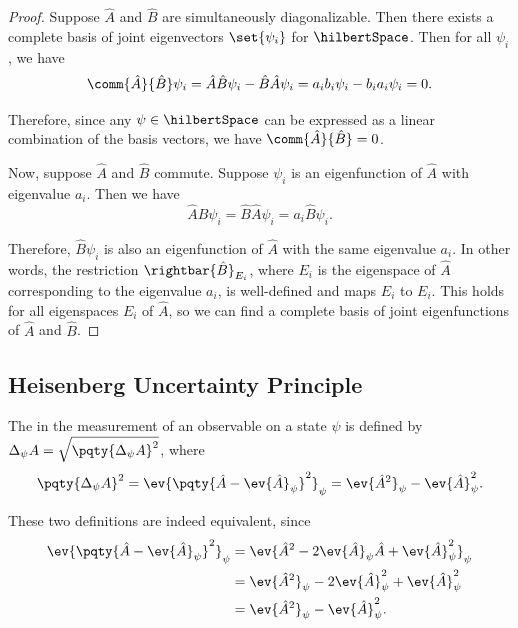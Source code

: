 \begin{proof}
    Suppose \(\hat{A}\) and \(\hat{B}\) are simultaneously diagonalizable. Then there exists a complete basis of joint eigenvectors \(\set{\psi_i}\) for \(\hilbertSpace\). Then for all \(\psi_i\), we have
    \begin{equation}
        \comm{\hat{A}}{\hat{B}} \psi_i = \hat{A} \hat{B} \psi_i - \hat{B} \hat{A} \psi_i = a_i b_i \psi_i - b_i a_i \psi_i = 0.
    \end{equation}

    Therefore, since any \(\psi \in \hilbertSpace\) can be expressed as a linear combination of the basis vectors, we have \(\comm{\hat{A}}{\hat{B}} = 0\).

    Now, suppose \(\hat{A}\) and \(\hat{B}\) commute. Suppose \(\psi_i\) is an eigenfunction of \(\hat{A}\) with eigenvalue \(a_i\). Then we have
    \begin{equation}
        \hat{A} \hat{B} \psi_i = \hat{B} \hat{A} \psi_i = a_i \hat{B} \psi_i.
    \end{equation}

    Therefore, \(\hat{B} \psi_i\) is also an eigenfunction of \(\hat{A}\) with the same eigenvalue \(a_i\). In other words, the restriction \(\rightbar{\hat{B}}_{E_i}\), where \(E_i\) is the eigenspace of \(\hat{A}\) corresponding to the eigenvalue \(a_i\), is well-defined and maps \(E_i\) to \(E_i\). This holds for all eigenspaces \(E_i\) of \(\hat{A}\), so we can find a complete basis of joint eigenfunctions of \(\hat{A}\) and \(\hat{B}\).
\end{proof}

\subsection{Heisenberg Uncertainty Principle}

\begin{definition}
    The  in the measurement of an observable on a state \(\psi\) is defined by \(\Delta_\psi A = \sqrt{\pqty{\Delta_\psi A}^2}\), where
    \[
        \pqty{\Delta_\psi A}^2 = \ev{\pqty{\hat{A} - \ev{\hat{A}}_\psi}^2}_\psi = \ev{\hat{A}^2}_\psi - \ev{\hat{A}}_\psi^2.
    \]
\end{definition}

These two definitions are indeed equivalent, since
\begin{subequations}
    \begin{align}
        \ev{\pqty{\hat{A} - \ev{\hat{A}}_\psi}^2}_\psi &= \ev{\hat{A}^2 - 2 \ev{\hat{A}}_\psi \hat{A} + \ev{\hat{A}}_\psi^2}_\psi \\
        &= \ev{\hat{A}^2}_\psi - 2 \ev{\hat{A}}_\psi^2 + \ev{\hat{A}}_\psi^2 \\
        &= \ev{\hat{A}^2}_\psi - \ev{\hat{A}}_\psi^2.
    \end{align}
\end{subequations}

